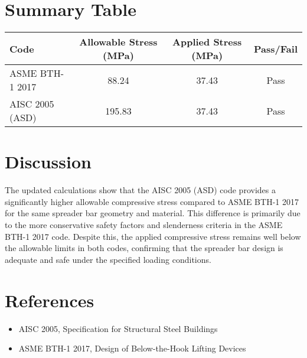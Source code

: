 \documentclass[12pt]{article}
\begin{document}
\section*{Summary Table}
\begin{center}
\begin{tabular}{@{}lccc@{}}
\toprule
Code & Allowable Stress (MPa) & Applied Stress (MPa) & Pass/Fail \\
\midrule
ASME BTH-1 2017 & 88.24 & 37.43 & Pass \\
AISC 2005 (ASD) & 195.83 & 37.43 & Pass \\
\bottomrule
\end{tabular}
\end{center}

\section*{Discussion}
The updated calculations show that the AISC 2005 (ASD) code provides a significantly higher allowable compressive stress compared to ASME BTH-1 2017 for the same spreader bar geometry and material. This difference is primarily due to the more conservative safety factors and slenderness criteria in the ASME BTH-1 2017 code. Despite this, the applied compressive stress remains well below the allowable limits in both codes, confirming that the spreader bar design is adequate and safe under the specified loading conditions.

\section*{References}
\begin{itemize}
    \item AISC 2005, Specification for Structural Steel Buildings
    \item ASME BTH-1 2017, Design of Below-the-Hook Lifting Devices
\end{itemize}
\end{document}
